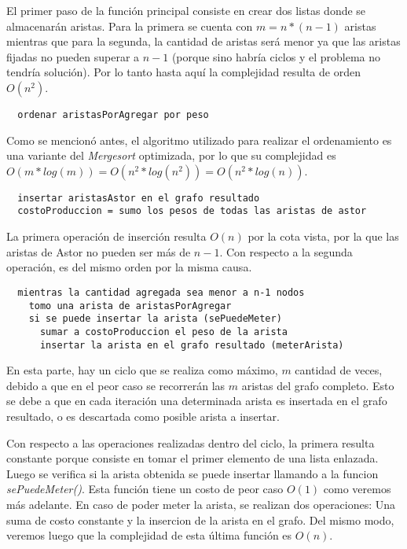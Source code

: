 \documentclass[a4paper,11pt] {article}
\begin{document}
El primer paso de la función principal consiste en crear dos listas donde se almacenarán aristas. Para la primera se cuenta con $m = n*(n-1)$ aristas mientras que para la segunda, la cantidad de aristas será menor ya que las aristas fijadas no pueden superar a $n-1$ (porque sino habría ciclos y el problema no tendría solución). Por lo tanto hasta aquí la complejidad resulta de orden $O(n^2)$.

\begin{verbatim}
  ordenar aristasPorAgregar por peso
\end{verbatim}

Como se mencionó antes, el algoritmo utilizado para realizar el ordenamiento es una variante del \textit{Mergesort} optimizada, por lo que su complejidad es $O(m*log(m)) = O(n^2*log(n^2)) = O(n^2*log(n))$.

\begin{verbatim}
  insertar aristasAstor en el grafo resultado
  costoProduccion = sumo los pesos de todas las aristas de astor
\end{verbatim}

La primera operación de inserción resulta $O(n)$ por la cota vista, por la que las aristas de Astor no pueden ser más de $n-1$. Con respecto a la segunda operación, es del mismo orden por la misma causa.

\begin{verbatim}
  mientras la cantidad agregada sea menor a n-1 nodos
    tomo una arista de aristasPorAgregar
    si se puede insertar la arista (sePuedeMeter)
      sumar a costoProduccion el peso de la arista
      insertar la arista en el grafo resultado (meterArista)
\end{verbatim}

En esta parte, hay un ciclo que se realiza como máximo, $m$ cantidad de veces, debido a que en el peor caso se recorrerán las $m$ aristas del grafo completo. Esto se debe a que en cada iteración una determinada arista es insertada en el grafo resultado, o es descartada como posible arista a insertar.

Con respecto a las operaciones realizadas dentro del ciclo, la primera resulta constante porque consiste en tomar el primer elemento de una lista enlazada. Luego se verifica si la arista obtenida se puede insertar llamando a la funcion \textit{sePuedeMeter()}. Esta función tiene un costo de peor caso $O(1)$ como veremos más adelante. En caso de poder meter la arista, se realizan dos operaciones: Una suma de costo constante y la insercion de la arista en el grafo. Del mismo modo, veremos luego que la complejidad de esta última función es $O(n)$.
\end{document}
